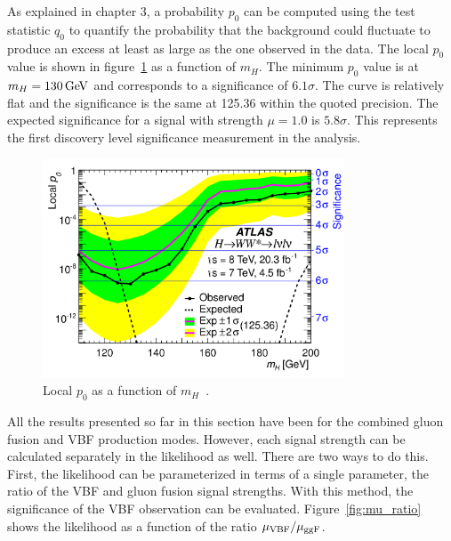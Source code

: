 As explained in chapter 3, a probability $p_0$ can be computed using the test statistic $q_0$ to quantify the probability that the background could fluctuate to produce an excess at least as large as the one observed in the data. The local $p_0$ value is shown in figure~\ref{fig:p0} as a function of $m_H$. The minimum $p_0$ value is at $m_H = 130 \GeV$ and corresponds to a significance of $6.1\sigma$. The curve is relatively flat and the significance is the same at 125.36 \GeV within the quoted precision. The expected significance for a signal with strength $\mu = 1.0$ is $5.8\sigma$. This represents the first discovery level significance measurement in the \HWWfull analysis. 

\begin{figure}[h!]
  \centering
  \captionsetup{justification=centering}

  \includegraphics[width=0.8\textwidth]{figures/WW_p0}
  \caption{Local $p_0$ as a function of $m_H$~\cite{WW2015}.}
  \label{fig:p0}
\end{figure}

All the results presented so far in this section have been for the combined gluon fusion and VBF production modes. However, each signal strength can be calculated separately in the likelihood as well. There are two ways to do this. First, the likelihood can be parameterized in terms of a single parameter, the ratio of the VBF and gluon fusion signal strengths. With this method, the significance of the VBF observation can be evaluated. Figure~\ref{fig:mu_ratio} shows the likelihood as a function of the ratio $\mu_{{\rm VBF}}/\mu_{{\rm ggF}}$.

